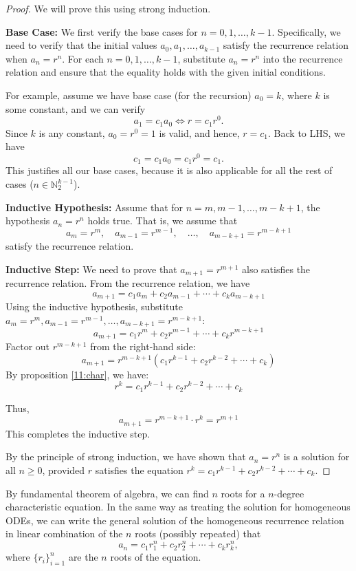 \documentclass[12pt,a4paper]{article}
\begin{document}
\begin{proof}
We will prove this using strong induction.

\textbf{Base Case:} 
We first verify the base cases for $n = 0, 1, \dots, k-1$. Specifically, we need to verify that the initial values $a_0, a_1, \dots, a_{k-1}$ satisfy the recurrence relation when $a_n = r^n$. For each $n = 0, 1, \dots, k-1$, substitute $a_n = r^n$ into the recurrence relation and ensure that the equality holds with the given initial conditions.

For example, assume we have base case (for the recursion) $a_0 = k$, where $k$ is some constant, and we can verify 
$$a_1 = c_1a_0 \iff r = c_1r^0.$$
Since $k$ is any constant, $a_0=r^0=1$ is valid, and hence, $r = c_1$. Back to LHS, we have 
\[
c_1 = c_1a_0 = c_1r^0 = c_1.
\]
This justifies all our base cases, because it is also applicable for all the rest of cases ($n\in\mathbb{N}_2^{k-1}$).

\textbf{Inductive Hypothesis:} 
Assume that for $n = m, m-1, \dots, m-k+1$, the hypothesis $a_n = r^n$ holds true. That is, we assume that
\[
a_m = r^m, \quad a_{m-1} = r^{m-1}, \quad \dots, \quad a_{m-k+1} = r^{m-k+1}
\]
satisfy the recurrence relation.

\textbf{Inductive Step:} 
We need to prove that $a_{m+1} = r^{m+1}$ also satisfies the recurrence relation.
From the recurrence relation, we have
\[
a_{m+1} = c_1 a_m + c_2 a_{m-1} + \cdots + c_k a_{m-k+1}
\]
Using the inductive hypothesis, substitute $a_m = r^m, a_{m-1} = r^{m-1}, \dots, a_{m-k+1} = r^{m-k+1}$:
\[
a_{m+1} = c_1 r^m + c_2 r^{m-1} + \cdots + c_k r^{m-k+1}
\]
Factor out $r^{m-k+1}$ from the right-hand side:
\[
a_{m+1} = r^{m-k+1} \left( c_1 r^{k-1} + c_2 r^{k-2} + \cdots + c_k \right)
\]
By proposition \eqref{11:char}, we have:
\[
r^k = c_1 r^{k-1} + c_2 r^{k-2} + \cdots + c_k
\]

Thus,
\[
a_{m+1} = r^{m-k+1} \cdot r^k = r^{m+1}
\]
This completes the inductive step.

By the principle of strong induction, we have shown that $a_n = r^n$ is a solution for all $n \geq 0$, provided $r$ satisfies the equation $r^k = c_1 r^{k-1} + c_2 r^{k-2} + \cdots + c_k$.
\end{proof}






By fundamental theorem of algebra, we can find $n$ roots for a $n$-degree characteristic equation. In the same way as treating the solution for homogeneous ODEs, we can write the general solution of the homogeneous recurrence relation in linear combination of the $n$ roots (possibly repeated) that
\[
a_n=c_1 r_1^n+c_2 r_2^n+\cdots+c_k r_k^n,
\]
where $\{r_i\}_{i=1}^n$ are the $n$ roots of the equation.
\end{document}
